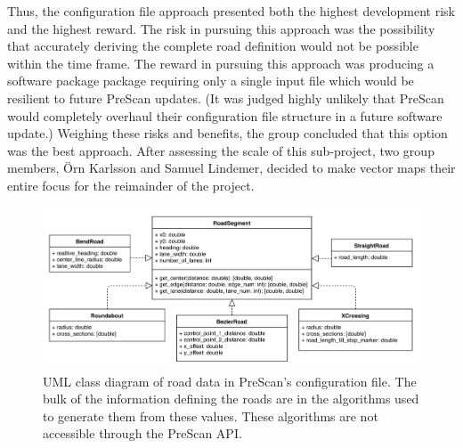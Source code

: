 \documentclass[12pt,twoside]{article}
\begin{document}
Thus, the configuration file approach presented both the highest development risk and the highest reward. The risk in pursuing this approach was the possibility that accurately deriving the complete road definition would not be possible within the time frame. The reward in pursuing this approach was producing a software package package requiring only a single input file which would be resilient to future PreScan updates. (It was judged highly unlikely that PreScan would completely overhaul their configuration file structure in a future software update.) Weighing these risks and benefits, the group concluded that this option was the best approach. After assessing the scale of this sub-project, two group members, Örn Karlsson and Samuel Lindemer, decided to make vector maps their entire focus for the reimainder of the project.

\begin{figure}[ht]
    \centering
    \includegraphics[width=18cm,keepaspectratio]{pex-uml.png}
    \caption{UML class diagram of road data in PreScan's configuration file. The bulk of the information defining the roads are in the algorithms used to generate them from these values. These algorithms are not accessible through the PreScan API.}
    \label{fig:pex-uml}
\end{figure}
\end{document}
